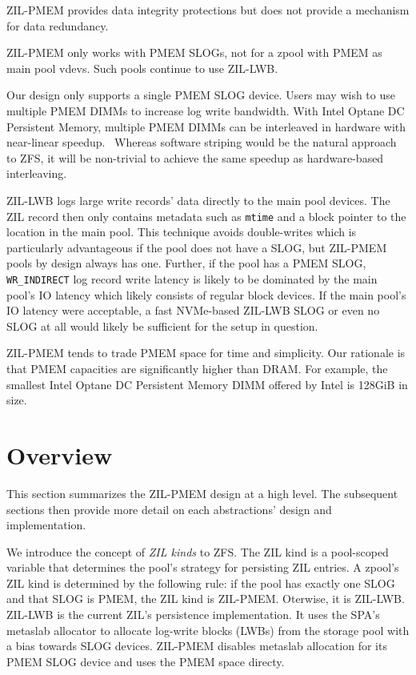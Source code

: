 \documentclass[12pt,a4paper,twoside,draft]{book}
\begin{document}
ZIL-PMEM provides data integrity protections but does not provide a mechanism for data redundancy.

ZIL-PMEM only works with PMEM SLOGs, not for a zpool with PMEM as main pool vdevs.
Such pools continue to use ZIL-LWB.

Our design only supports a single PMEM SLOG device.
Users may wish to use multiple PMEM DIMMs to increase log write bandwidth.
With Intel Optane DC Persistent Memory, multiple PMEM DIMMs can be interleaved in hardware with near-linear speedup.~\cite{yang_empirical_2020}
Whereas software striping would be the natural approach to ZFS, it will be non-trivial to achieve the same speedup as hardware-based interleaving.

ZIL-LWB logs large write records' data directly to the main pool devices.
The ZIL record then only contains metadata such as \lstinline{mtime} and a block pointer to the location in the main pool.
This technique avoids double-writes which is particularly advantageous if the pool does not have a SLOG, but ZIL-PMEM pools by design always has one.
Further, if the pool has a PMEM SLOG, \lstinline{WR_INDIRECT} log record write latency is likely to be dominated by the main pool's IO latency which likely consists of regular block devices.
If the main pool's IO latency were acceptable, a fast NVMe-based ZIL-LWB SLOG or even no SLOG at all would likely be sufficient for the setup in question.

ZIL-PMEM tends to trade PMEM space for time and simplicity.
Our rationale is that PMEM capacities are significantly higher than DRAM.
For example, the smallest Intel Optane DC Persistent Memory DIMM offered by Intel is 128GiB in size.~\cite{optanepricing_missing}

\section{Overview}
This section summarizes the ZIL-PMEM design at a high level.
The subsequent sections then provide more detail on each abstractions' design and implementation.

We introduce the concept of \textit{ZIL kinds} to ZFS.
The ZIL kind is a pool-scoped variable that determines the pool's strategy for persisting ZIL entries.
A zpool's ZIL kind is determined by the following rule:
if the pool has exactly one SLOG and that SLOG is PMEM, the ZIL kind is ZIL-PMEM. Oterwise, it is ZIL-LWB.
ZIL-LWB is the current ZIL's persistence implementation.
It uses the SPA's metaslab allocator to allocate log-write blocks (LWBs) from the storage pool with a bias towards SLOG devices.
ZIL-PMEM disables metaslab allocation for its PMEM SLOG device and uses the PMEM space directy.
\end{document}
